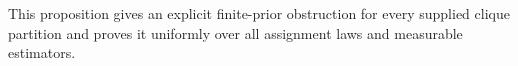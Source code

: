 This proposition gives an explicit finite-prior obstruction for every supplied clique partition and proves it uniformly over all assignment laws and measurable estimators.